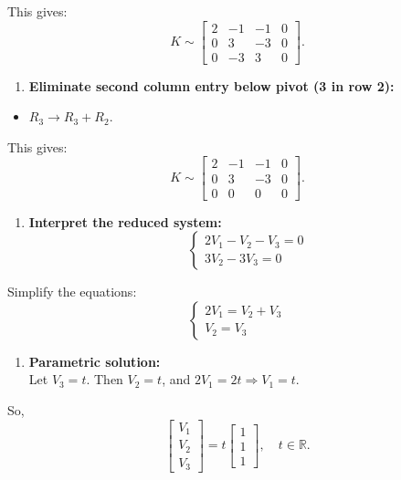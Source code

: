 \documentclass[
  letterpaper,
  DIV=11,
  numbers=noendperiod]{scrreprt}
\providecommand{\tightlist}{%
  \setlength{\itemsep}{0pt}\setlength{\parskip}{0pt}}
\begin{document}
This gives: \[
K\sim \left[\begin{array}{ccc|c}
2 & -1 & -1 & 0\\
0 & 3 & -3 & 0\\
0 & -3 & 3 & 0
\end{array}\right].
\]

\begin{enumerate}
\def\labelenumi{\arabic{enumi}.}
\setcounter{enumi}{2}
\tightlist
\item
  \textbf{Eliminate second column entry below pivot (3 in row 2):}\\
\end{enumerate}

\begin{itemize}
\tightlist
\item
  \(R_3 \to R_3 + R_2\).
\end{itemize}

This gives: \[
K\sim \left[\begin{array}{ccc|c}
2 & -1 & -1 & 0\\
0 & 3 & -3 & 0\\
0 & 0 & 0 & 0
\end{array}\right].
\]

\begin{enumerate}
\def\labelenumi{\arabic{enumi}.}
\setcounter{enumi}{3}
\tightlist
\item
  \textbf{Interpret the reduced system:} \[
  \begin{cases}
  2V_1 - V_2 - V_3 = 0 \\
  3V_2 - 3V_3 = 0
  \end{cases}
  \]
\end{enumerate}

Simplify the equations: \[
\begin{cases}
2V_1 = V_2 + V_3 \\
V_2 = V_3
\end{cases}
\]

\begin{enumerate}
\def\labelenumi{\arabic{enumi}.}
\setcounter{enumi}{4}
\tightlist
\item
  \textbf{Parametric solution:}\\
  Let \(V_3 = t\). Then \(V_2 = t\), and
  \(2V_1 = 2t \Rightarrow V_1 = t\).
\end{enumerate}

So, \[
\begin{bmatrix}V_1\\V_2\\V_3\end{bmatrix} 
= t \begin{bmatrix}1\\1\\1\end{bmatrix}, \quad t \in \mathbb{R}.
\]
\end{document}
